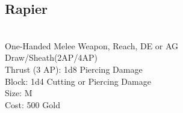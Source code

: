 \subsection{Rapier}\label{weapon:rapier}\\
One-Handed Melee Weapon,  Reach, DE or AG\\
Draw/Sheath(2AP/4AP)\\
Thrust (3 AP): 1d8 Piercing Damage\\
Block: 1d4 Cutting or Piercing Damage\\
Size: M\\
Cost: 500 Gold\\